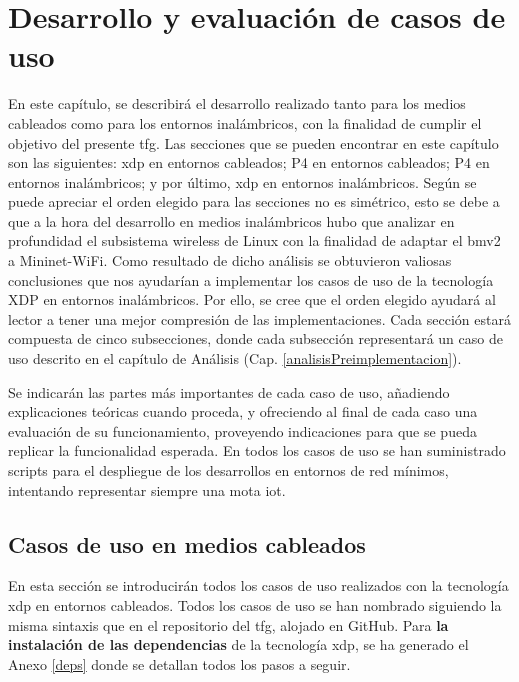 \chapter{Desarrollo y evaluación de casos de uso}
\label{desarrollo}

En este capítulo, se describirá el desarrollo realizado tanto para los medios cableados como para los entornos inalámbricos, con la finalidad de cumplir el objetivo del presente \gls{tfg}. Las secciones que se pueden encontrar en este capítulo son las siguientes: \gls{xdp} en entornos cableados; P4 en entornos cableados; P4 en entornos inalámbricos; y por último, \gls{xdp} en entornos inalámbricos. Según se puede apreciar el orden elegido para las secciones no es simétrico, esto se debe a que a la hora del desarrollo en medios inalámbricos hubo que analizar en profundidad el subsistema wireless de Linux con la finalidad de adaptar el \gls{bmv2} a Mininet-WiFi. Como resultado de dicho análisis se obtuvieron valiosas conclusiones que nos ayudarían a implementar los casos de uso de la tecnología XDP en entornos inalámbricos. Por ello, se cree que el orden elegido ayudará al lector a tener una mejor compresión de las implementaciones.  Cada sección estará compuesta de cinco subsecciones, donde cada subsección representará un caso de uso descrito en el capítulo de Análisis (Cap. \ref{analisisPreimplementacion}).\\
\par

Se indicarán las partes más importantes de cada caso de uso, añadiendo explicaciones teóricas cuando proceda, y ofreciendo al final de cada caso una evaluación de su funcionamiento, proveyendo indicaciones para que se pueda replicar la funcionalidad esperada. En todos los casos de uso se han suministrado scripts para el despliegue de los desarrollos en entornos de red mínimos, intentando representar siempre una mota \gls{iot}.


\section{Casos de uso  en medios cableados}

En esta sección se introducirán todos los casos de uso realizados con la tecnología \gls{xdp} en entornos cableados. Todos los casos de uso se han nombrado siguiendo la misma sintaxis que en el repositorio del \gls{tfg}, alojado en GitHub. Para \textbf{la instalación de las dependencias} de la tecnología \gls{xdp}, se ha generado el Anexo \ref{deps} donde se detallan todos los pasos a seguir.\\
\par


